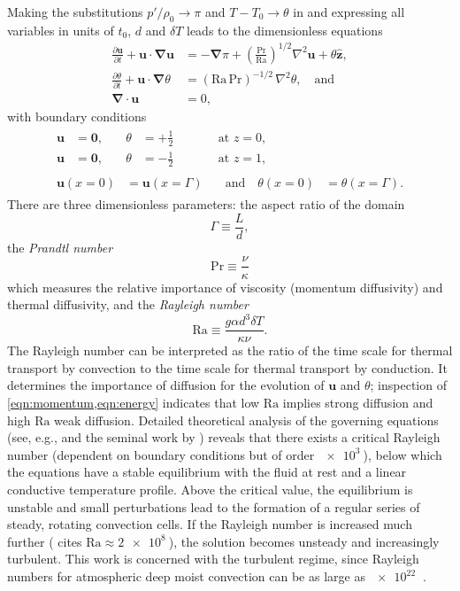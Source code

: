 \documentclass[titlepage]{article}
\numberwithin{equation}{section}
\newcommand{\pdiff}[2]{\frac{\partial #1}{\partial #2}}
\renewcommand\vec{\bm}
\newcommand{\uvec}[1]{\vec{\hat{#1}}}
\newcommand{\grad}{\vec{\nabla}}
\newcommand{\prandtl}{\ensuremath{\mathrm{Pr}}}
\newcommand{\rayleigh}{\ensuremath{\mathrm{Ra}}}
\begin{document}
Making the substitutions $p'/\rho_0 \to \pi$ and $T - T_0 \to \theta$
in  and expressing all
variables in units of $t_0$, $d$ and $\delta T$ leads to the dimensionless
equations
\begin{align}
    \label{eqn:momentum}
    \pdiff{\vec{u}}{t} + \vec{u} \cdot \grad \vec{u}
        &= -\grad \pi + \left( \frac{\prandtl}{\rayleigh}\right)^{1/2}
        \nabla^2 \vec{u} + \theta \uvec{z}, \\
    \label{eqn:energy}
    \pdiff{\theta}{t} + \vec{u} \cdot \grad \theta
        &= (\rayleigh\,\prandtl)^{-1/2} \, \nabla^2 \theta, \quad \text{and} \\
    \label{eqn:incompressible}
    \grad \cdot \vec{u} &= 0,
\end{align}
with boundary conditions
\begin{gather}
\begin{alignat}{3}
    \label{eqn:bc_bot}
    \vec{u} &= \vec{0}, &\quad \theta &= +\frac{1}{2}
    &\qquad& \text{at } z = 0, \\
    \label{eqn:bc_top}
    \vec{u} &= \vec{0}, &\quad \theta &= -\frac{1}{2}
    &\qquad& \text{at } z = 1,
\end{alignat} \\
\begin{alignat}{2}
    \label{eqn:bc_sides}
    \vec{u}(x=0) &= \vec{u}(x=\Gamma)
    &\quad \text{and} \quad \theta(x=0) &= \theta(x=\Gamma).
\end{alignat}
\end{gather}
There are three dimensionless parameters: the aspect ratio of the domain
\[
    \Gamma \equiv \frac{L}{d},
\]
the \emph{Prandtl number}
\[
    \prandtl \equiv \frac{\nu}{\kappa}
\]
which measures the relative importance of viscosity (momentum diffusivity)
and thermal diffusivity, and the \emph{Rayleigh number}
\[
    \rayleigh \equiv \frac{g \alpha d^3 \delta T}{\kappa \nu}.
\]
The Rayleigh number can be interpreted as the ratio of the time scale for
thermal transport by convection to the time scale for thermal transport by
conduction. It determines the importance of diffusion for the evolution of
$\vec{u}$ and $\theta$; inspection of \cref{eqn:momentum,eqn:energy} indicates
that low $\rayleigh$ implies strong diffusion and high $\rayleigh$ weak
diffusion. Detailed theoretical analysis of the governing equations (see, e.g.,
\textcite{chandrasekhar1961} and the seminal work by \textcite{rayleigh1916})
reveals that there exists a critical Rayleigh number (dependent on boundary
conditions but of order $\SI{e3}{}$), below which the equations have a stable
equilibrium with the fluid at rest and a linear conductive temperature profile.
Above the critical value, the equilibrium is unstable and small perturbations
lead to the formation of a regular series of steady, rotating convection cells.
If the Rayleigh number is increased much further (\textcite{le_quere1991} cites
$\rayleigh \approx \SI{2e8}{}$), the solution becomes unsteady and increasingly
turbulent. This work is concerned with the turbulent regime, since Rayleigh
numbers for atmospheric deep moist convection can be as large as $\SI{e22}{}$
\parencite{chilla2012}.
\end{document}

